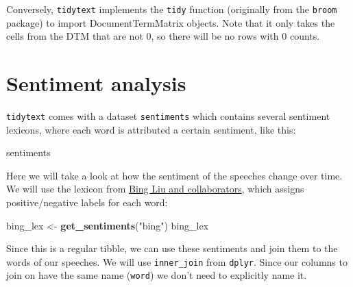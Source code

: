 \documentclass[]{book}
\newenvironment{Shaded}{\begin{snugshade}}{\end{snugshade}}
\newcommand{\CommentTok}[1]{\textcolor[rgb]{0.56,0.35,0.01}{\textit{#1}}}
\newcommand{\KeywordTok}[1]{\textcolor[rgb]{0.13,0.29,0.53}{\textbf{#1}}}
\newcommand{\NormalTok}[1]{#1}
\newcommand{\OperatorTok}[1]{\textcolor[rgb]{0.81,0.36,0.00}{\textbf{#1}}}
\newcommand{\StringTok}[1]{\textcolor[rgb]{0.31,0.60,0.02}{#1}}
\begin{document}
Conversely, \texttt{tidytext} implements the \texttt{tidy} function (originally from the \texttt{broom} package) to import DocumentTermMatrix objects. Note that it only takes the cells from the DTM that are not 0, so there will be no rows with 0 counts.

\hypertarget{sentiment-analysis}{%
\section{Sentiment analysis}\label{sentiment-analysis}}

\texttt{tidytext} comes with a dataset \texttt{sentiments} which contains several sentiment lexicons, where each word is attributed a certain sentiment, like this:

\begin{Shaded}
\begin{Highlighting}[]
\NormalTok{sentiments}
\end{Highlighting}
\end{Shaded}

Here we will take a look at how the sentiment of the speeches change over time. We will use the lexicon from \href{https://www.cs.uic.edu/~liub/FBS/sentiment-analysis.html}{Bing Liu and collaborators}, which assigns positive/negative labels for each word:

\begin{Shaded}
\begin{Highlighting}[]
\NormalTok{bing_lex <-}\StringTok{ }\KeywordTok{get_sentiments}\NormalTok{(}\StringTok{"bing"}\NormalTok{)}
\NormalTok{bing_lex}
\end{Highlighting}
\end{Shaded}

Since this is a regular tibble, we can use these sentiments and join them to the words of our speeches. We will use \texttt{inner\_join} from \texttt{dplyr}. Since our columns to join on have the same name (\texttt{word}) we don't need to explicitly name it.

\begin{Shaded}
\end{Shaded}
\end{document}
